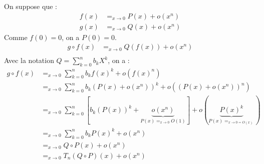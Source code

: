 \documentclass[../main.tex]{subfiles}
\begin{document}
\noindent On suppose que : 
\begin{align*}
    f(x) &=_{x\to 0} P(x) + o(x^n) \\
    g(x) &=_{x\to 0} Q(x) + o(x^n)
\end{align*}
Comme $f(0) = 0$, on a $P(0) = 0$. \\
\begin{align*}
    g \circ f(x) &=_{x\to 0} Q(f(x)) + o(x^n) \\
\end{align*}
Avec la notation $Q = \sum\limits_{k=0}^{n} b_k X^k$, on a :
\begin{align*}
    g\circ f(x) &=_{x\to 0} \sum_{k=0}^{n} b_k f(x)^k + o(f(x)^n) \\
    &=_{x\to 0} \sum_{k=0}^{n} b_k (P(x) + o(x^n))^k + o((P(x) + o(x^n))^n) \\
    &=_{x\to 0} \sum_{k=0}^{n} [b_k (P(x))^k + \underbrace{o(x^n)}_{P(x) =_{x\to 0} O(1)}] + o(\underbrace{P(x)^k}_{P(x) =_{x\to 0 = O(x)}}) \\
    &=_{x\to 0} \sum_{k=0}^{n} b_k P(x)^k + o(x^n) \\
    &=_{x\to 0} Q\circ P(x) + o(x^n) \\
    &=_{x\to 0} T_n(Q\circ P)(x) + o(x^n)
\end{align*}
\end{document}
